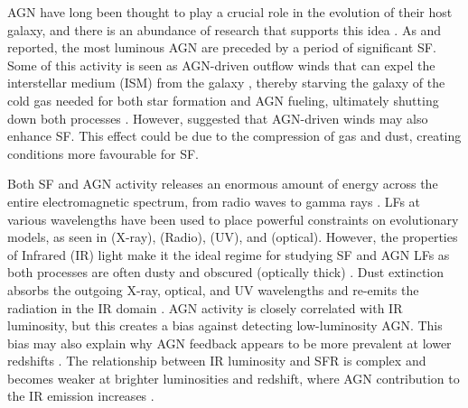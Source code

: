 AGN have long been thought to play a crucial role in the evolution of their host galaxy, and there is an abundance of research that supports this idea \citep{merloni_synthesis_2008, assef_mid-ir-_2011, reines_relations_2015, cowley_zfourge_2016}. As \cite{kauffmann_host_2003, hopkins_cosmological_2008} and \cite{hopkins_how_2010} reported, the most luminous AGN are preceded by a period of significant SF. Some of this activity is seen as AGN-driven outflow winds that can expel the interstellar medium (ISM) from the galaxy \citep{schawinski_observational_2007, cicone_massive_2014, fiore_agn_2017}, thereby starving the galaxy of the cold gas needed for both star formation and AGN fueling, ultimately shutting down both processes \citep{hopkins_how_2010}. However, \cite{silk_unleashing_2013} suggested that AGN-driven winds may also enhance SF. This effect could be due to the compression of gas and dust, creating conditions more favourable for SF.

Both SF and AGN activity releases an enormous amount of energy across the entire electromagnetic spectrum, from radio waves to gamma rays \citep{ho_spectral_1999, huang_local_2007, silva_modelling_2011, gruppioni_modelling_2011}. LFs at various wavelengths have been used to place powerful constraints on evolutionary models, as seen in \cite{aird_evolution_2015, alqasim_new_2023} (X-ray), \cite{yuan_determining_2018} (Radio), \cite{page_ultraviolet_2021} (UV), and \cite{cool_galaxy_2012} (optical). However, the properties of Infrared (IR) light make it the ideal regime for studying SF and AGN LFs as both processes are often dusty and obscured (optically thick) \citep{wu_mid-infrared_2011, han_evolution_2012}. Dust extinction absorbs the outgoing X-ray, optical, and UV wavelengths and re-emits the radiation in the IR domain \citep{fu_decomposing_2010, toba_9_2013, oconnor_luminosity_2016, symeonidis_agn_2021}. AGN activity is closely correlated with IR luminosity, \citep{kauffmann_host_2003, wu_mid-infrared_2011, symeonidis_what_2019, symeonidis_agn_2021} but this creates a bias against detecting low-luminosity AGN. This bias may also explain why AGN feedback appears to be more prevalent at lower redshifts \citep{katsianis_evolution_2017, pouliasis_obscured_2020}. The relationship between IR luminosity and SFR is complex \citep{symeonidis_agn_2021} and becomes weaker at brighter luminosities and redshift, where AGN contribution to the IR emission increases \citep{wu_mid-infrared_2011}. 

